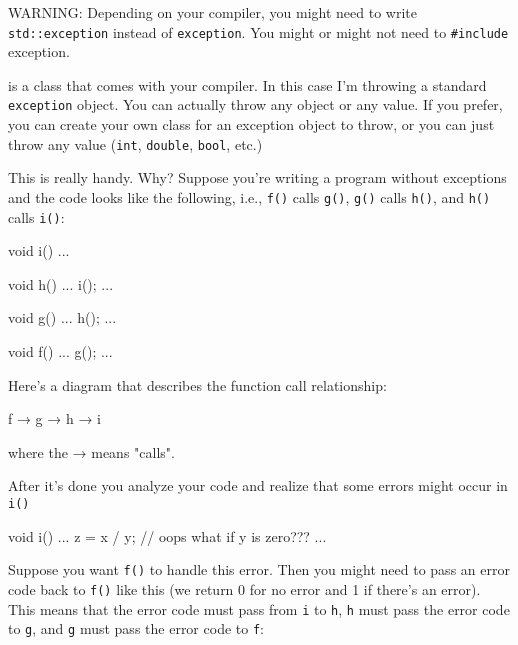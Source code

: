 WARNING: Depending on your compiler, you might need to write
\texttt{std::exception} instead of \texttt{exception}. You might or might
not need to \texttt{\#include} exception.

\texttt{} is a class that comes with your compiler. In this case I'm throwing a standard \texttt{exception} object. You can actually throw any object or any value. If you prefer, you can create your own class for an exception object to throw, or you can just throw any value (\texttt{int}, \texttt{double}, \texttt{bool}, etc.)

This is really handy. Why? Suppose you're writing a program without exceptions and the code looks like the following, i.e., \texttt{f()} calls \texttt{g()}, \texttt{g()} calls \texttt{h()}, and \texttt{h()} calls \texttt{i()}:

\begin{console}
void i()
{    
     ...
}

void h()
{    
     ...
     i();
     ...
}

void g()
{    
     ...
     h();
     ...
}

void f()
{    
     ...
     g();
     ...
}
\end{console}

Here's a diagram that describes the function call
relationship:
\begin{console}
f → g → h → i
\end{console}
where the → means "calls".

After it's done you analyze your code and realize that
some errors might occur in \texttt{i()}

\begin{console}
void i()
{    
     ...
     z = x / y; // oops what if y is zero???
     ...
}
\end{console}

Suppose you want \texttt{f()} to handle this error. Then you might need to
pass an error code back to \texttt{f()} like this (we return 0 for no
error and 1 if there's an error). This means that the
error code must pass from \texttt{i} to \texttt{h}, \texttt{h} must pass the
error code to \texttt{g}, and \texttt{g} must pass the error code to
\texttt{f}:


